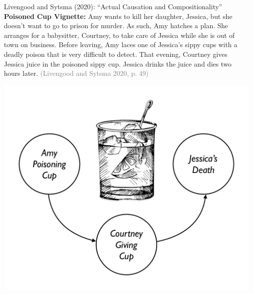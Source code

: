 \documentclass[xcolor=table,9pt,aspectratio=169]{beamer}
\begin{document}
\begin{frame}{\vspace*{10mm}Livengood and Sytsma (2020): ``Actual Causation and Compositionality''}
\vspace*{-5mm}
\textbf{Poisoned Cup Vignette:} Amy wants to kill her daughter, Jessica, but she doesn't want to go to prison for murder. As such, Amy hatches a plan. She arranges for a babysitter, Courtney, to take care of Jessica while she is out of town on business. Before leaving, Amy laces one of Jessica's sippy cups with a deadly poison that is very difficult to detect. That evening, Courtney gives Jessica juice in the poisoned sippy cup. Jessica drinks the juice and dies two hours later. \textcolor{gray}{(Livengood and Sytsma 2020, p. 49)}
\begin{center}
   \includegraphics[width=0.3\linewidth]{figures/poison.pdf}
\end{center}
\end{frame}
\end{document}
